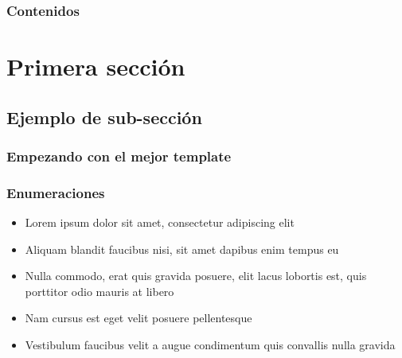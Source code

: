 %
%

\begin{frame}
	\titlepage
\end{frame}

\begin{frame}
	\frametitle{Contenidos}
	\tableofcontents
\end{frame}

\section{Primera sección}

\subsection{Ejemplo de sub-sección}


\begin{frame}
	\frametitle{Empezando con el mejor template}
	\lipsum[1]
\end{frame}


\begin{frame}
	\frametitle{Enumeraciones}
	\begin{itemize}
		\item Lorem ipsum dolor sit amet, consectetur adipiscing elit
		\item Aliquam blandit faucibus nisi, sit amet dapibus enim tempus eu
		\item Nulla commodo, erat quis gravida posuere, elit lacus lobortis est, quis porttitor odio mauris at libero
		\item Nam cursus est eget velit posuere pellentesque
		\item Vestibulum faucibus velit a augue condimentum quis convallis nulla gravida
	\end{itemize}
\end{frame}

